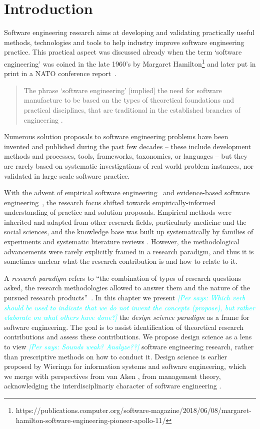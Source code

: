 \documentclass[graybox]{svmult}
\newcommand{\per}[1]{\textcolor{cyan}{{\it [Per says: #1]}}}
\newcommand{\per}[1]{}
\begin{document}
\section{Introduction}
\label{sec:intro}


Software engineering research aims at developing and validating practically useful methods, technologies and tools to help industry improve software engineering practice. This practical aspect was discussed already when the term `software engineering' was coined in the late 1960's by Margaret Hamilton\footnote{https://publications.computer.org/software-magazine/2018/06/08/margaret-hamilton-software-engineering-pioneer-apollo-11/} and later put in print in a NATO conference report~\cite{Nato1968}. 

\begin{quote}
{The phrase `software engineering'  [implied] the need for software manufacture to be based on the types of theoretical foundations and practical disciplines, that are traditional in the established branches of engineering} \cite[p. 13]{Nato1968}. 
\end{quote}

Numerous solution proposals to software engineering problems have been invented and published during the past few decades -- these include development methods and processes, tools, frameworks, taxonomies, or languages -- but they are rarely based on systematic investigations of real world problem instances, nor validated in large scale software practice.

With the advent of empirical software engineering~\cite{Basili86} and evidence-based software engineering~\cite{Kitchenham04}, the research focus shifted towards  empirically-informed understanding of practice and solution proposals. Empirical methods were inherited and adapted from other research fields, particularly medicine and the social sciences, and the knowledge base was built up systematically by families of experiments \cite{Basili99} and systematic literature reviews \cite{Kitchenham15}. However, the methodological advancements were rarely explicitly framed in a research paradigm, and thus it is sometimes unclear what the research contribution is and how to relate to it. 

A \emph{research paradigm} refers to ``the combination of types of research questions asked, the research methodologies allowed to answer them and the nature of the pursued research products''~\cite{van_aken_management_2004}. In this chapter we present \per{Which verb should be used to indicate that we do not invent the concepts (propose), but rather elaborate on what others have done?} the \emph{design science paradigm} as a frame for software engineering. The goal is to assist identification of theoretical research contributions and assess these contributions. We propose design science as a lens to view \per{Sounds weak? Analyze??} software engineering research, rather than prescriptive methods on how to conduct it. 
Design science is earlier proposed by Wieringa \cite{wieringa_what_2014} for information systems and software engineering, which we merge with perspectives from van Aken \cite{van_aken_management_2004}, from management theory, acknowledging the interdisciplinariy character of software engineering \cite{Mendez2019}.
\end{document}
